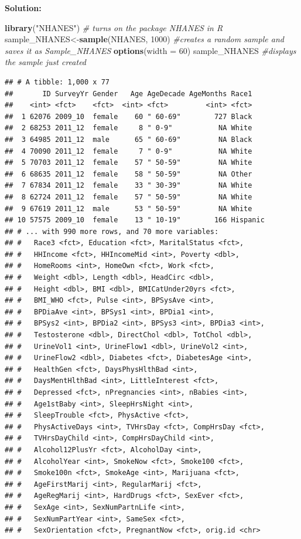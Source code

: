 \documentclass[
]{book}
\newenvironment{Shaded}{\begin{snugshade}}{\end{snugshade}}
\newcommand{\CommentTok}[1]{\textcolor[rgb]{0.56,0.35,0.01}{\textit{#1}}}
\newcommand{\DataTypeTok}[1]{\textcolor[rgb]{0.13,0.29,0.53}{#1}}
\newcommand{\DecValTok}[1]{\textcolor[rgb]{0.00,0.00,0.81}{#1}}
\newcommand{\KeywordTok}[1]{\textcolor[rgb]{0.13,0.29,0.53}{\textbf{#1}}}
\newcommand{\NormalTok}[1]{#1}
\newcommand{\StringTok}[1]{\textcolor[rgb]{0.31,0.60,0.02}{#1}}
\begin{document}
\textbf{Solution:}

\begin{Shaded}
\begin{Highlighting}[]
\KeywordTok{library}\NormalTok{(}\StringTok{"NHANES"}\NormalTok{) }\CommentTok{# turns on the package NHANES in R}
\NormalTok{sample_NHANES<-}\KeywordTok{sample}\NormalTok{(NHANES, }\DecValTok{1000}\NormalTok{) }
\CommentTok{#creates a random sample and saves it as Sample_NHANES}
\KeywordTok{options}\NormalTok{(}\DataTypeTok{width =} \DecValTok{60}\NormalTok{)}
\NormalTok{sample_NHANES }\CommentTok{#displays the sample just created}
\end{Highlighting}
\end{Shaded}

\begin{verbatim}
## # A tibble: 1,000 x 77
##       ID SurveyYr Gender   Age AgeDecade AgeMonths Race1   
##    <int> <fct>    <fct>  <int> <fct>         <int> <fct>   
##  1 62076 2009_10  female    60 " 60-69"        727 Black   
##  2 68253 2011_12  female     8 " 0-9"           NA White   
##  3 64985 2011_12  male      65 " 60-69"         NA Black   
##  4 70090 2011_12  female     7 " 0-9"           NA White   
##  5 70703 2011_12  female    57 " 50-59"         NA White   
##  6 68635 2011_12  female    58 " 50-59"         NA Other   
##  7 67834 2011_12  female    33 " 30-39"         NA White   
##  8 62724 2011_12  female    57 " 50-59"         NA White   
##  9 67619 2011_12  male      53 " 50-59"         NA White   
## 10 57575 2009_10  female    13 " 10-19"        166 Hispanic
## # ... with 990 more rows, and 70 more variables:
## #   Race3 <fct>, Education <fct>, MaritalStatus <fct>,
## #   HHIncome <fct>, HHIncomeMid <int>, Poverty <dbl>,
## #   HomeRooms <int>, HomeOwn <fct>, Work <fct>,
## #   Weight <dbl>, Length <dbl>, HeadCirc <dbl>,
## #   Height <dbl>, BMI <dbl>, BMICatUnder20yrs <fct>,
## #   BMI_WHO <fct>, Pulse <int>, BPSysAve <int>,
## #   BPDiaAve <int>, BPSys1 <int>, BPDia1 <int>,
## #   BPSys2 <int>, BPDia2 <int>, BPSys3 <int>, BPDia3 <int>,
## #   Testosterone <dbl>, DirectChol <dbl>, TotChol <dbl>,
## #   UrineVol1 <int>, UrineFlow1 <dbl>, UrineVol2 <int>,
## #   UrineFlow2 <dbl>, Diabetes <fct>, DiabetesAge <int>,
## #   HealthGen <fct>, DaysPhysHlthBad <int>,
## #   DaysMentHlthBad <int>, LittleInterest <fct>,
## #   Depressed <fct>, nPregnancies <int>, nBabies <int>,
## #   Age1stBaby <int>, SleepHrsNight <int>,
## #   SleepTrouble <fct>, PhysActive <fct>,
## #   PhysActiveDays <int>, TVHrsDay <fct>, CompHrsDay <fct>,
## #   TVHrsDayChild <int>, CompHrsDayChild <int>,
## #   Alcohol12PlusYr <fct>, AlcoholDay <int>,
## #   AlcoholYear <int>, SmokeNow <fct>, Smoke100 <fct>,
## #   Smoke100n <fct>, SmokeAge <int>, Marijuana <fct>,
## #   AgeFirstMarij <int>, RegularMarij <fct>,
## #   AgeRegMarij <int>, HardDrugs <fct>, SexEver <fct>,
## #   SexAge <int>, SexNumPartnLife <int>,
## #   SexNumPartYear <int>, SameSex <fct>,
## #   SexOrientation <fct>, PregnantNow <fct>, orig.id <chr>
\end{verbatim}
\end{document}

